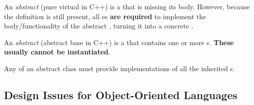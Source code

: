 \begin{definition}\label{def:OOP_Abstract_Method}
  An \emph{abstract } (pure virtual  in C++) is a  that is missing its body.
  However, because the  definition is still present, all es \textbf{are required} to implement the body/functionality of the abstract , turning it into a concrete .
\end{definition}

\begin{definition}\label{def:OOP_Abstract_Class}
  An \emph{abstract } (abstract base  in C++) is a  that contains one or more s.
  \textbf{These usually cannot be instantiated}.
  
  Any  of an abstract class must provide implementations of all the inherited s.
\end{definition}

\subsection{Design Issues for Object-Oriented Languages}\label{subsec:OOP_Design_Issues}
